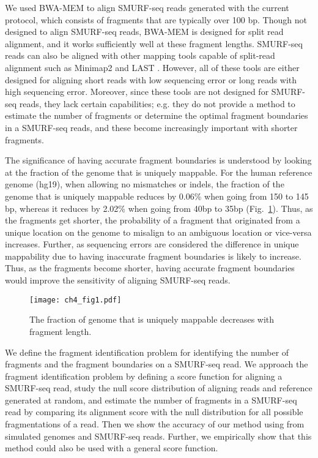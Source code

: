 We used BWA-MEM \cite{li2013aligning} to align SMURF-seq reads generated
with the current protocol, which consists of fragments that are
typically over 100 bp. Though not designed to align SMURF-seq reads,
BWA-MEM is designed for split read alignment, and it works sufficiently
well at these fragment lengths.  SMURF-seq reads can also be aligned
with other mapping tools capable of split-read alignment such as
Minimap2 \cite{li2018minimap2} and LAST \cite{kielbasa2011adaptive}.
However, all of these tools are either designed for aligning short reads
with low sequencing error or long reads with high sequencing error.
%
Moreover, since these tools are not designed for SMURF-seq reads, they
lack certain capabilities; e.g. they do not provide a method to estimate
the number of fragments or determine the optimal fragment boundaries in
a SMURF-seq reads, and these become increasingly important with shorter
fragments.

The significance of having accurate fragment boundaries is understood by
looking at the fraction of the genome that is uniquely mappable. For the
human reference genome (hg19), when allowing no mismatches or indels,
the fraction of the genome that is uniquely mappable reduces by 0.06\%
when going from 150 to 145 bp, whereas it reduces by 2.02\% when going
from 40bp to 35bp (Fig.~\ref{dzones}).
Thus, as the fragments get shorter, the probability of a fragment that
originated from a unique location on the genome to misalign to an
ambiguous location or vice-versa increases.
Further, as sequencing errors are considered the difference in unique
mappability due to having inaccurate fragment boundaries is likely to
increase.
%
Thus, as the fragments become shorter, having accurate fragment
boundaries would improve the sensitivity of aligning SMURF-seq reads.

\begin{figure}[t!]
\centering
\texttt{[image: ch4\_fig1.pdf]}
\caption{The fraction of genome that is uniquely mappable decreases with
          fragment length.}
\label{dzones}
\end{figure}


We define the fragment identification problem for identifying the
number of fragments and the fragment boundaries on a SMURF-seq read.
We approach the fragment identification problem by defining a score
function for aligning a SMURF-seq read, study the null score distribution of
aligning reads and reference generated at random, and estimate the
number of fragments in a SMURF-seq read by comparing its alignment score
with the null distribution for all possible fragmentations of a read.
Then we show the accuracy of our method using from simulated genomes and
SMURF-seq reads. Further, we empirically show that this method could
also be used with a general score function.


